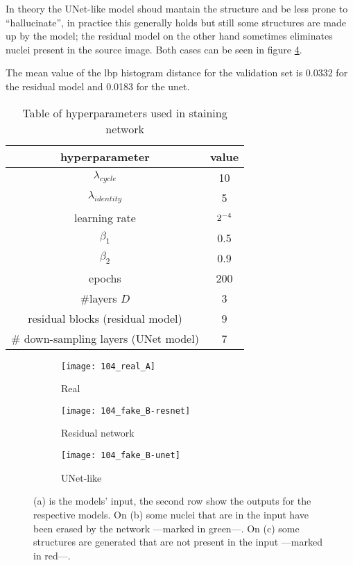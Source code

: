 \documentclass[../main.tex]{subfiles}
\begin{document}
In theory the UNet-like model shoud mantain the structure and be less prone
to ``hallucinate'', in practice this generally holds but still some structures
are made up by the model; the residual model on the other hand sometimes
eliminates nuclei present in the source image. Both cases can be seen in figure
\ref{fig:resnet-unet}.

The mean value of the \gls{lbp} histogram distance for the validation
set is 0.0332 for the residual model and 0.0183 for the unet.

\begin{table}
\centering
\begin{tabular}{cc}
\toprule
hyperparameter & value \\
\midrule
$\lambda_{cycle}$ & 10 \\
$\lambda_{identity}$ & 5 \\
learning rate & $2 \time 10^{-4}$ \\
$\beta_1$ & 0.5 \\
$\beta_2$ & 0.9 \\
epochs & 200 \\
\#layers $D$ & 3 \\
residual blocks (residual model) & 9 \\
\# down-sampling layers (UNet model) & 7 \\
\bottomrule
\end{tabular}
\caption{Table of hyperparameters used in staining network}
\label{tab:hyperparameters}
\end{table}

\begin{figure}[h]
\centering
\begin{subfigure}{.5\textwidth}
  \centering
  \texttt{[image: 104\_real\_A]}
  \caption{Real}
  \label{fig:real-example}
\end{subfigure}
\begin{subfigure}{.5\textwidth}
  \centering
  \texttt{[image: 104\_fake\_B-resnet]}
  \caption{Residual network}
  \label{fig:resnet-example}
\end{subfigure}%
\begin{subfigure}{.5\textwidth}
  \centering
  \texttt{[image: 104\_fake\_B-unet]}
  \caption{UNet-like}
  \label{fig:unet-example}
\end{subfigure}
\caption{(a) is the models' input, the second row show the outputs for the
respective models. On (b) some nuclei that are in the input have been
erased by the network ---marked in green---. On (c) some structures are
generated that are not present in the input ---marked in red---.}
\label{fig:resnet-unet}
\end{figure}
\end{document}
